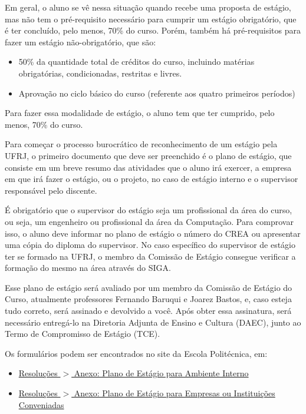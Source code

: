            Em geral, o aluno se vê nessa situação quando recebe uma proposta de estágio, mas não tem o pré-requisito necessário para cumprir um estágio obrigatório, que é ter concluído, pelo menos, 70\% do curso. Porém, também há pré-requisitos para fazer um estágio não-obrigatório, que são:
                \begin{itemize}
                    \item 50\% da quantidade total de créditos do curso, incluindo matérias obrigatórias, condicionadas, restritas e livres.
                    \item Aprovação no ciclo básico do curso (referente aos quatro primeiros períodos)
                \end{itemize}
        
        
            Para fazer essa modalidade de estágio, o aluno tem que ter cumprido, pelo menos, 70\% do curso.
        
            Para começar o processo burocrático de reconhecimento de um estágio pela UFRJ, o primeiro documento que deve ser preenchido é o plano de estágio, que consiste em um breve resumo das atividades que o aluno irá exercer, a empresa em que irá fazer o estágio, ou o projeto, no caso de estágio interno e o supervisor responsável pelo discente. 
            
            É obrigatório que o supervisor do estágio seja um profissional da área do curso, ou seja, um engenheiro ou profissional da área da Computação. Para comprovar isso, o aluno deve informar no plano de estágio o número do CREA ou apresentar uma cópia do diploma do supervisor. No caso específico do supervisor de estágio ter se formado na UFRJ, o membro da Comissão de Estágio consegue verificar a formação do mesmo na área através do SIGA.
            
            Esse plano de estágio será avaliado por um membro da Comissão de Estágio do Curso, atualmente professores Fernando Baruqui e Joarez Bastos, e, caso esteja tudo correto, será assinado e devolvido a você. Após obter essa assinatura, será necessário entregá-lo na Diretoria Adjunta de Ensino e Cultura (DAEC), junto ao Termo de Compromisso de Estágio (TCE).
        
            Os formulários podem ser encontrados no site da Escola Politécnica, em:
            
            \begin{itemize}
                \item \href{http://www.poli.ufrj.br/arquivos/resolucoes/Anexo_Resolucao_n_03_de_29_05_2013_Plano_de_Estagio_Obrigatorio_ambiente_interno.pdf}{Resoluções $>$ Anexo: Plano de Estágio para Ambiente Interno}
            
                \item \href{http://www.poli.ufrj.br/arquivos/resolucoes/AnexoResolucao_n03de29052013_Plano_de_Estagio_empresa.pdf}{Resoluções $>$ Anexo: Plano de Estágio para Empresas ou Instituições Conveniadas}
            \end{itemize}
        
